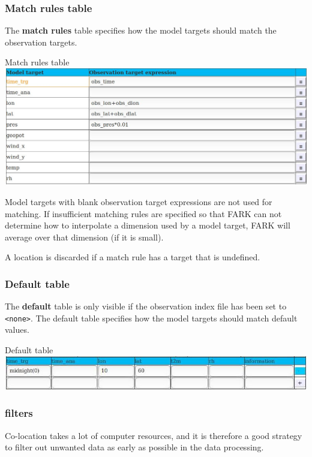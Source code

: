 \documentclass[letterpaper,10pt,twoside,twocolumn,openany]{book}
\begin{document}
\subsubsection{Match rules table}
The {\bf match rules} table specifies how the model targets should match the
observation targets. 
\begin{paperbox}{Match rules table}
  \includegraphics[width=\columnwidth]{coloc_match.jpg}
\end{paperbox}
Model targets with blank observation target expressions are not used for matching.
If insufficient matching rules are specified so that FARK can not determine how to
interpolate a dimension used by a model target, FARK will average over that dimension (if it is small).

\begin{quotebox}
A location is discarded if a match rule has a target that is undefined.
\end{quotebox}

\hypertarget{default}{}
\subsubsection{Default table}
The {\bf default} table is only visible if the observation index file has been set to \lstinline!<none>!.
The default table specifies how the model targets should match default values.
\begin{paperbox}{Default table}
  \includegraphics[width=\columnwidth]{default.jpg}
\end{paperbox}

\subsubsection{filters}

Co-location takes a lot of computer resources, and it is therefore a good strategy
to filter out unwanted data as early as possible in the data processing.
\end{document}
